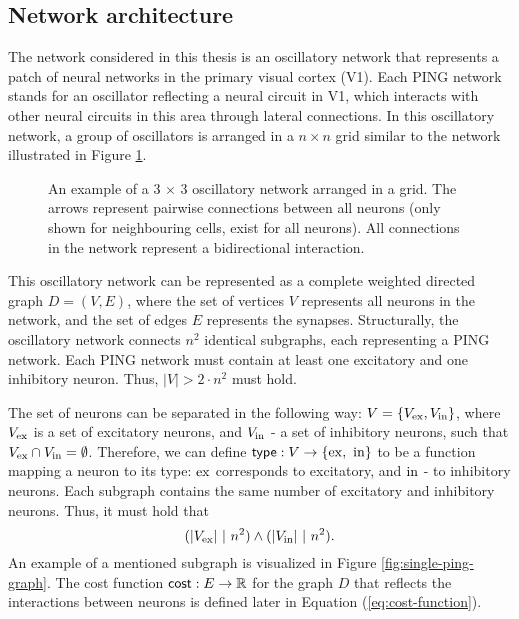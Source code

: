 \subsection{Network architecture}
\label{sec:grid-network}

The network considered in this thesis is an oscillatory network that represents a patch of neural networks in the primary visual cortex (V1). Each PING network stands for an oscillator reflecting a neural circuit in V1, which interacts with other neural circuits in this area through lateral connections.
In this oscillatory network, a group of oscillators is arranged in a $n \times n$ grid similar to the network illustrated in Figure \ref{fig:oscillatory-grid-graph}.

\begin{figure}[!htp]
    \centering
    
    \caption[Grid oscillatory network]{An example of a 3 $\times$ 3 oscillatory network arranged in a grid. The arrows represent pairwise connections between all neurons (only shown for neighbouring cells, exist for all neurons). All connections in the network represent a bidirectional interaction.}
    \label{fig:oscillatory-grid-graph}
\end{figure}

This oscillatory network can be represented as a complete weighted directed graph $D = (V, E)$, where the set of vertices $V$ represents all neurons in the network, and the set of edges $E$ represents the synapses. Structurally, the oscillatory network connects $n^2$ identical subgraphs, each representing a PING network. Each PING network must contain at least one excitatory and one inhibitory neuron. Thus, $|V| > 2 \cdot n^2$ must hold.

The set of neurons can be separated in the following way: $V = \{ V_{\mathrm{ex}}, V_{\mathrm{in}}\}$, where $V_{\mathrm{ex}}$ is a set of excitatory neurons, and $V_{\mathrm{in}}$ - a set of inhibitory neurons, such that $V_{\mathrm{ex}} \cap V_{\mathrm{in}} = \emptyset$.
Therefore, we can define $\mathsf{type}: V \to \{ \mathrm{ex}, \ \mathrm{in} \}$ to be a function mapping a neuron to its type: $\mathrm{ex}$ corresponds to excitatory, and $\mathrm{in}$ - to inhibitory neurons. Each subgraph contains the same number of excitatory and inhibitory neurons. Thus, it must hold that
\begin{equation}
    (|V_{\mathrm{ex}}| \ | \ n^2) \land (|V_{\mathrm{in}}| \ | \ n^2).
\end{equation}
An example of a mentioned subgraph is visualized in Figure \ref{fig:single-ping-graph}. 
The cost function $\mathsf{cost}: E \to \mathbb{R}$ for the graph $D$ that reflects the interactions between neurons is defined later in Equation (\ref{eq:cost-function}).

